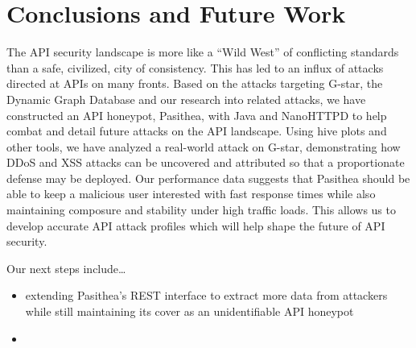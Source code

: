 
\section{Conclusions and Future Work} \label{conclusions}

The API security landscape is more like a ``Wild West'' of conflicting standards than a safe, civilized, city of consistency.
This has led to an influx of attacks directed at APIs on many  fronts. 
Based on the attacks targeting G-star, the Dynamic Graph Database and our research into related attacks, we have constructed an API honeypot, Pasithea, with Java and NanoHTTPD to help combat and detail future attacks on the API landscape. 
Using hive plots and other tools, we have analyzed a real-world attack on G-star, demonstrating how DDoS and XSS attacks can be uncovered and attributed so that a proportionate defense may be deployed.  
Our performance data suggests that Pasithea should be able to keep a malicious user interested with fast response times while also maintaining composure and stability under high traffic loads. 
This allows us to develop accurate API attack profiles which will help shape the future of API security.

Our next steps include\ldots
\begin{itemize}
   \item extending Pasithea’s REST interface to extract more data from attackers while still maintaining its cover as an unidentifiable API honeypot
    \item 
\end{itemize}
